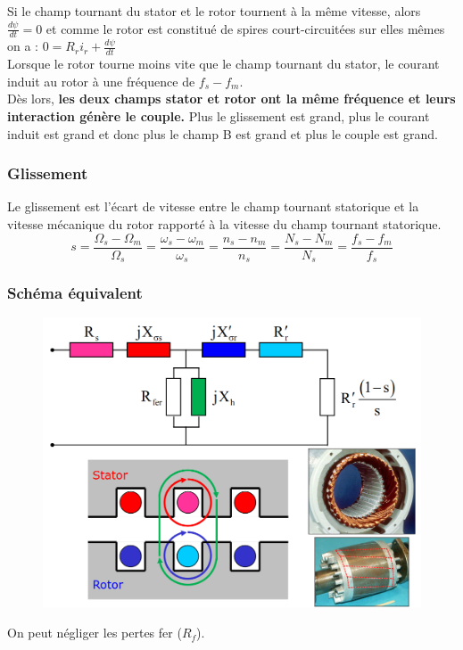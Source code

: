 \documentclass[../main.tex]{subfiles}
\begin{document}
Si le champ tournant du stator et le rotor tournent à la même vitesse, alors $\frac{d\psi}{dt}=0$ et comme le rotor est constitué de spires court-circuitées sur elles mêmes on a : $0 = R_r i_r + \frac{d\psi}{dt}$\\

Lorsque le rotor tourne moins vite que le champ tournant du stator, le courant induit au rotor à une fréquence de $f_s-f_m$.\\

Dès lors, \textbf{les deux champs stator et rotor ont la même fréquence et leurs interaction génère le couple.} Plus le glissement est grand, plus le courant induit est grand et donc plus le champ B est grand et plus le couple est grand.\\

\subsubsection{Glissement}
Le glissement est l'écart de vitesse entre le champ tournant statorique et la vitesse mécanique du rotor rapporté à la vitesse du champ tournant statorique.\\

\begin{equation}
    s = \frac{\Omega_s-\Omega_m}{\Omega_s} = \frac{\omega_s-\omega_m}{\omega_s} = \frac{n_s-n_m}{n_s} = \frac{N_s-N_m}{N_s} = \frac{f_s-f_m}{f_s}
\end{equation}

\subsubsection{Schéma équivalent}
\begin{figure}[hbt!]
    \centering
    \includegraphics[width=.5\textwidth]{IMAGES/machineelec/async.png}
\end{figure}

On peut négliger les pertes fer ($R_f$).\\
\end{document}
